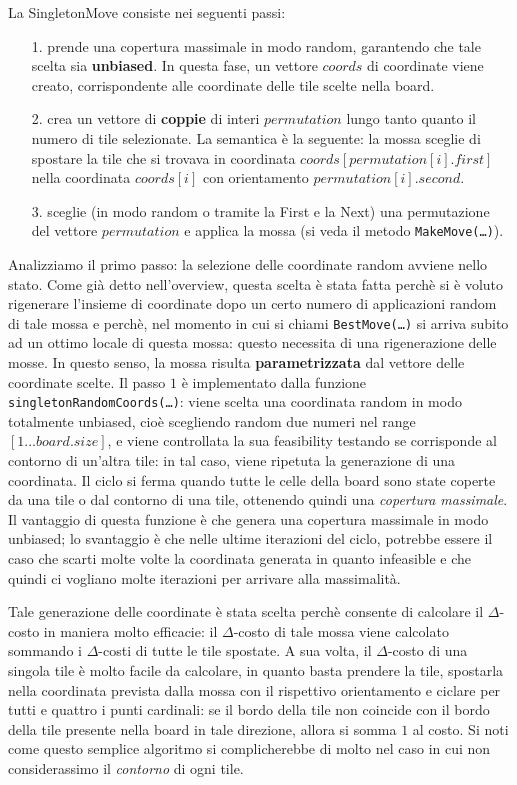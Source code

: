     La SingletonMove consiste nei seguenti passi:
    \begin{itemize}
    	\item[1.] prende una copertura massimale in modo random, garantendo che tale scelta sia \textbf{unbiased}. In questa fase, un vettore $coords$ di coordinate viene creato, corrispondente alle coordinate delle tile scelte nella board. 
    	\item[2.] crea un vettore di \textbf{coppie} di interi $permutation$ lungo tanto quanto il numero di tile selezionate. La semantica è la seguente: la mossa sceglie di spostare la tile che si trovava in coordinata $coords[permutation[i].first]$ nella coordinata $coords[i]$ con orientamento $permutation[i].second$.
    	\item[3.] sceglie (in modo random o tramite la First e la Next) una permutazione del vettore $permutation$ e applica la mossa (si veda il metodo \texttt{MakeMove(\dots)}).
    \end{itemize}

    Analizziamo il primo passo: la selezione delle coordinate random avviene nello stato. Come già detto nell'overview, questa scelta è stata fatta perchè si è voluto rigenerare l'insieme di coordinate dopo un certo numero di applicazioni random di tale mossa e perchè, nel momento in cui si chiami \texttt{BestMove(\dots)} si arriva subito ad un ottimo locale di questa mossa: questo necessita di una rigenerazione delle mosse. In questo senso, la mossa risulta \textbf{parametrizzata} dal vettore delle coordinate scelte. Il passo $1$ è implementato dalla funzione \texttt{singletonRandomCoords(\dots)}: viene scelta una coordinata random in modo totalmente unbiased, cioè scegliendo random due numeri nel range $[1 \dots board.size]$, e viene controllata la sua feasibility testando se corrisponde al contorno di un'altra tile: in tal caso, viene ripetuta la generazione di una coordinata. Il ciclo si ferma quando tutte le celle della board sono state coperte da una tile o dal contorno di una tile, ottenendo quindi una \textit{copertura massimale}. Il vantaggio di questa funzione è che genera una copertura massimale in modo unbiased; lo svantaggio è che nelle ultime iterazioni del ciclo, potrebbe essere il caso che scarti molte volte la coordinata generata in quanto infeasible e che quindi ci vogliano molte iterazioni per arrivare alla massimalità.

    Tale generazione delle coordinate è stata scelta perchè consente di calcolare il $\Delta$-costo in maniera molto efficacie: il $\Delta$-costo di tale mossa viene calcolato sommando i $\Delta$-costi di tutte le tile spostate. A sua volta, il $\Delta$-costo di una singola tile è molto facile da calcolare, in quanto basta prendere la tile, spostarla nella coordinata prevista dalla mossa con il rispettivo orientamento e ciclare per tutti e quattro i punti cardinali: se il bordo della tile non coincide con il bordo della tile presente nella board in tale direzione, allora si somma $1$ al costo. Si noti come questo semplice algoritmo si complicherebbe di molto nel caso in cui non considerassimo il \textit{contorno} di ogni tile.

